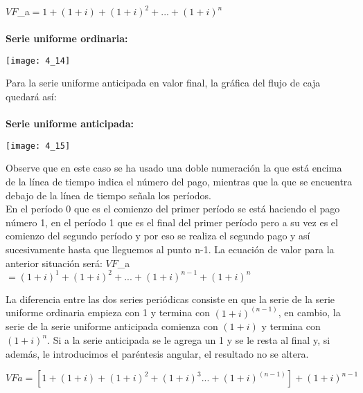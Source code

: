 {\vspace{5mm}

      	$VF$_{a}$=1+ (1+i) +(1+i)^{2}+...+(1+i)^{n} $ \\
      	
\vspace{5mm}
\\
\textbf{Serie uniforme ordinaria:}
\begin{center}
    
	\texttt{[image: 4\_14]}
	
\end{center}

Para la serie uniforme anticipada en valor final, la gráfica del flujo de caja quedará así:
\textbf{\\ \\ Serie uniforme anticipada:} 
\begin{center}
    
	\texttt{[image: 4\_15]}
	
\end{center}
Observe que en este caso se ha usado una doble numeración la que está encima de la línea de tiempo indica el número del pago, mientras que la que se encuentra debajo de la línea de tiempo señala los períodos. \\

En el período 0 que es el comienzo del primer período se está haciendo el pago número 1, en el período 1 que es el final del primer período pero a su vez es el comienzo del segundo período y por eso se realiza el segundo pago y así sucesivamente hasta que lleguemos al punto n-1. La ecuación de valor para la anterior situación será:
\vspace{5mm}
    	$VF$_{a}$=(1+i)^{1}  +(1+i)^{2}+...+(1+i)^{n-1}+(1+i)^{n}$
\vspace{5mm}

\clearpage

La diferencia entre las dos series periódicas consiste en que la serie de la serie uniforme ordinaria empieza con 1 y termina con $(1+i)^{(n-1)}$, en cambio, la serie de la serie uniforme anticipada comienza con $(1+i)$  y termina con $(1+i)^{n}$. Si a la serie anticipada se le agrega un 1 y se le resta al final y, si además, le introducimos el paréntesis angular, el resultado no se altera.

\vspace{5mm}
        $VFa=[1+(1+i) +(1+i)^{2}+(1+i)^{3}...+(1+i)^{(n-1)} ]+(1+i)^{n-1}$
\vspace{5mm}

}
